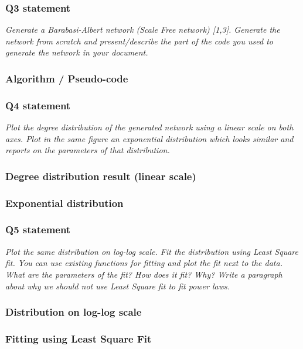 \documentclass{article}
\begin{document}
\subsubsection{Q3 statement}
\textit{Generate a Barabasi-Albert network (Scale Free network) [1,3]. Generate the network from scratch and present/describe the part of the code you used to generate the network in your document.}

\subsubsection*{Algorithm / Pseudo-code} 

\subsubsection{Q4 statement}
\textit{Plot the degree distribution of the generated network using a linear scale on both axes. Plot in the same figure an exponential distribution which looks similar and reports on the parameters of that distribution.}

\subsubsection*{Degree distribution result (linear scale)} 

\subsubsection*{Exponential distribution} 

\subsubsection{Q5 statement}
\textit{Plot the same distribution on log-log scale. Fit the distribution using Least Square fit. You can use existing functions for fitting and plot the fit next to the data. What are the parameters of the fit? How does it fit? Why? Write a paragraph about why we should not use Least Square fit to fit power laws.}

\subsubsection*{Distribution on log-log scale} 

\subsubsection*{Fitting using Least Square Fit} 
\end{document}
